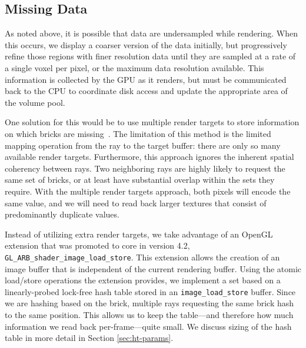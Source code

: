 
\subsection{Missing Data}

As noted above, it is possible that data are undersampled while
rendering.  When this occurs, we display a coarser version of the data
initially, but progressively refine those regions with finer resolution
data until they are sampled at a rate of a single voxel per pixel, or
the maximum data resolution available.  This information is collected
by the GPU as it renders, but must be communicated back to the CPU to
coordinate disk access and update the appropriate area of the volume
pool.

One solution for this would be to use multiple render targets to store
information on which bricks are missing~\cite{Crassin:2009:Gigavoxels}.
The limitation of this method is the limited mapping operation from
the ray to the target buffer: there are only so many available render
targets.
Furthermore, this approach ignores the inherent spatial coherency
between rays.  Two neighboring rays are highly likely to request the
same set of bricks, or at least have substantial overlap within the
sets they require.  With the multiple render targets approach, both
pixels will encode the same value, and we will need to read back larger
textures that consist of predominantly duplicate values.

Instead of utilizing extra render targets, we take advantage of an
OpenGL extension that was promoted to core in version 4.2,
\texttt{GL\_ARB\_shader\_image\_load\_store}.  This extension allows
the creation of an image buffer that is independent of the current
rendering buffer.  Using the atomic load/store operations the extension
provides, we implement a set based on a linearly-probed lock-free hash
table stored in an \texttt{image\_load\_store} buffer.  Since we are
hashing based on the brick, multiple rays requesting the same brick hash
to the same position.  This allows us to keep the table---and therefore
how much information we read back per-frame---quite small.  We discuss
sizing of the hash table in more detail in
Section \ref{sec:ht-params}.

